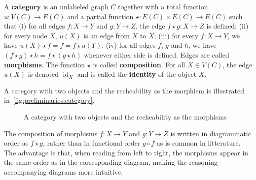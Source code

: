 \begin{definition}
    \label{def:cat}
    A \textbf{category} is an unlabeled graph \( C \) together with a total function \( u : V(C) \to E(C) \) and a partial function \( \star: E(C) \times E(C) \to E(C) \) such that 
        (i) for all edges \( f:X \to Y \) and \( g:Y \to Z \), the edge \( f \star g :X \to Z \) is defined; 
        (ii) for every node \( X \), \( u(X) \) is an edge from \( X \) to \( X \);
        (iii) for every \( f:X \to Y \), we have \(u(X) \star f = f = f \star u(Y)\);
        (iv) for all edges \( f \), \( g \) and \(h\), we have \( (f \star g) \star h = f \star (g \star h) \) whenever either side is defined.
    Edges are called \textbf{morphisms}. The function $\star$ is called \textbf{composition}. For all \( X \in V(C) \), the edge \( u(X) \) is denoted \( \operatorname{id}_X \) and is called the \textbf{identity} of the object \( X \).
\end{definition} 

\begin{example}
    A category with two objects and the recheability as the morphism is illustrated in~\autoref{fig:preliminaries:category}.
    \begin{figure}[hbtp]
        \centering
        \caption{A category with two objects and the recheability as the morphisms}
        \label{fig:preliminaries:category}
    \end{figure}
\end{example}

\begin{notation}
    The composition of morphisms \( f : X \to Y \) and \( g : Y \to Z \) is written in diagrammatic order as \( f \star g \), rather than in functional order \( g \circ f \) as is common in litterature. The advantage is that, when reading from left to right, the morphisms appear in the same order as in the corresponding diagram, making the reasoning accompanying diagrams more intuitive. 
\end{notation}  

